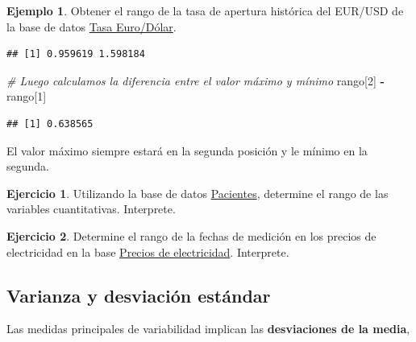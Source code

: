 \documentclass[
  11pt,
]{book}
\newenvironment{Shaded}{\begin{snugshade}}{\end{snugshade}}
\newcommand{\AttributeTok}[1]{\textcolor[rgb]{0.13,0.29,0.53}{#1}}
\newcommand{\CommentTok}[1]{\textcolor[rgb]{0.56,0.35,0.01}{\textit{#1}}}
\newcommand{\DecValTok}[1]{\textcolor[rgb]{0.00,0.00,0.81}{#1}}
\newcommand{\FunctionTok}[1]{\textcolor[rgb]{0.13,0.29,0.53}{\textbf{#1}}}
\newcommand{\NormalTok}[1]{#1}
\newcommand{\SpecialCharTok}[1]{\textcolor[rgb]{0.81,0.36,0.00}{\textbf{#1}}}
\theoremstyle{definition}
\theoremstyle{definition}
\newtheorem{example}{Ejemplo}[chapter]
\theoremstyle{definition}
\newtheorem{exercise}{Ejercicio}[chapter]
\theoremstyle{definition}
\theoremstyle{remark}
\begin{document}
\begin{example}
Obtener el rango de la tasa de apertura histórica del EUR/USD de la base de datos \hyperref[TasaEURUSD]{Tasa Euro/Dólar}.

\begin{Shaded}
\end{Shaded}

\begin{verbatim}
## [1] 0.959619 1.598184
\end{verbatim}

\begin{Shaded}
\begin{Highlighting}[]
\CommentTok{\# Luego calculamos la diferencia entre el valor máximo y mínimo}
\NormalTok{rango[}\DecValTok{2}\NormalTok{] }\SpecialCharTok{{-}}\NormalTok{ rango[}\DecValTok{1}\NormalTok{]}
\end{Highlighting}
\end{Shaded}

\begin{verbatim}
## [1] 0.638565
\end{verbatim}

El valor máximo siempre estará en la segunda posición y le mínimo en la segunda.
\end{example}

\begin{exercise}
Utilizando la base de datos \hyperref[Pacientes]{Pacientes}, determine el rango de las variables cuantitativas. Interprete.
\end{exercise}

\begin{exercise}
Determine el rango de la fechas de medición en los precios de electricidad en la base \hyperref[PreciosElectricidad]{Precios de electricidad}. Interprete.
\end{exercise}

\subsection{Varianza y desviación estándar}\label{varianza-y-desviaciuxf3n-estuxe1ndar}

Las medidas principales de variabilidad implican las \textbf{desviaciones de la media},
\end{document}
